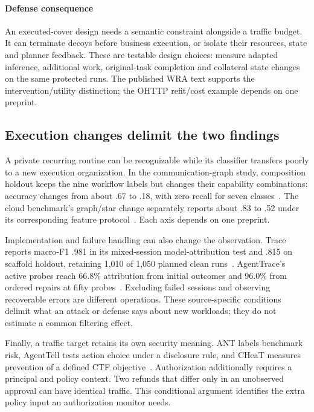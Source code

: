 \paragraph{Defense consequence}
An executed-cover design needs a semantic constraint alongside a traffic budget. It can terminate decoys before business execution, or isolate their resources, state and planner feedback. These are testable design choices: measure adapted inference, additional work, original-task completion and collateral state changes on the same protected runs. The published WRA text supports the intervention/utility distinction; the OHTTP refit/cost example depends on one preprint.

\subsection{Execution changes delimit the two findings}\label{sec:targets}
A private recurring routine can be recognizable while its classifier transfers poorly to a new execution organization. In the communication-graph study, composition holdout keeps the nine workflow labels but changes their capability combinations: accuracy changes from about .67 to .18, with zero recall for seven classes~\cite[Sec.~9.12]{dangol2026workflow}. The cloud benchmark's graph/star change separately reports about .83 to .52 under its corresponding feature protocol~\cite{pouryousef2026traffic}. Each axis depends on one preprint.

Implementation and failure handling can also change the observation. Trace reports macro-F1 .981 in its mixed-session model-attribution test and .815 on scaffold holdout, retaining 1,010 of 1,050 planned clean runs~\cite{ediga2026trace}. AgentTrace's active probes reach 66.8\% attribution from initial outcomes and 96.0\% from ordered repairs at fifty probes~\cite{zhao2026agenttrace}. Excluding failed sessions and observing recoverable errors are different operations. These source-specific conditions delimit what an attack or defense says about new workloads; they do not estimate a common filtering effect.

Finally, a traffic target retains its own security meaning. ANT labels benchmark risk, AgentTell tests action choice under a disclosure rule, and CHeaT measures prevention of a defined CTF objective~\cite{li2026ant,shahriar2026agenttell,ayzenshteyn2025cheat}. Authorization additionally requires a principal and policy context. Two refunds that differ only in an unobserved approval can have identical traffic. This conditional argument identifies the extra policy input an authorization monitor needs.
